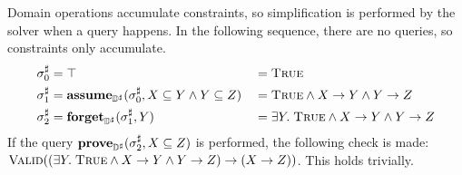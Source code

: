 \begin{example}
Domain operations accumulate constraints, so simplification is performed by the solver when a query happens.  In the following sequence, there are no queries, so constraints only accumulate.
\begin{align*}
  {\sigma}^{\sharp}_0 &= \top & &= \textsc{True} \\
  {\sigma}^{\sharp}_1 &= \textbf{assume}_{{\mathbb{D}}^{\sharp}}({\sigma}^{\sharp}_0, X \subseteq Y \wedge Y \subseteq Z) & &= \textsc{True} \wedge X \rightarrow Y \wedge Y \rightarrow Z \\
  {\sigma}^{\sharp}_2 &= \textbf{forget}_{{\mathbb{D}}^{\sharp}}({\sigma}^{\sharp}_1, Y) & &= \exists Y. \; \textsc{True} \wedge X \rightarrow Y \wedge Y \rightarrow Z
\end{align*}
If the query $\textbf{prove}_{{\mathbb{D}}^{\sharp}}({\sigma}^{\sharp}_2, X \subseteq Z)$ is performed, the following check is made: $\textsc{Valid}((\exists Y. \; \textsc{True} \wedge X \rightarrow Y \wedge Y \rightarrow Z) \rightarrow (X \rightarrow Z))$.  This holds trivially.
\end{example}
